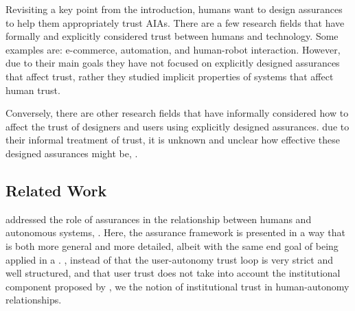     Revisiting a key point from the introduction, humans want to design assurances to help them appropriately trust AIAs. There are a few research fields that have formally and explicitly considered trust between humans and technology. Some examples are: e-commerce, automation, and human-robot interaction. However, due to their main goals they have not focused on explicitly designed assurances that affect trust, rather they studied implicit properties of systems that affect human trust.

    Conversely, there are other research fields that have informally considered how to affect the trust of designers and users using explicitly designed assurances.  due to their informal treatment of trust, it is unknown and unclear how effective these designed assurances might be, .

    

\subsection{Related Work}
    \citet{Lillard2016-yg} addressed the role of assurances in the relationship between humans and autonomous systems, . 
Here, the assurance framework is presented in a way that is both more general and more detailed, albeit with the same end goal of being applied in a .  
, instead of  that the user-autonomy trust loop is very strict and well structured, and that user trust does not take into account the institutional component proposed by \citet{McKnight2001-fa}, we  the notion of institutional trust in  human-autonomy relationships. 

